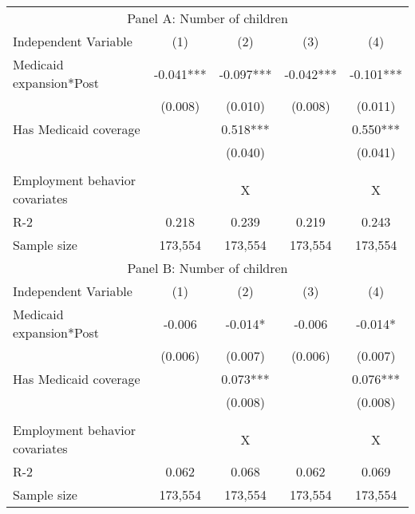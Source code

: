 \begin{tabular}{lcccc}
\toprule
\toprule
 \multicolumn{5}{c}{Panel A: Number of children } \\
 Independent Variable & (1) & (2) & (3) &  (4) \\
\midrule 
 Medicaid expansion*Post   & -0.041***   & -0.097***   & -0.042***   & -0.101***  \\
 & (0.008)   & (0.010)   & (0.008)   & (0.011)  \\
 Has Medicaid coverage   &   & 0.518***   &   & 0.550***  \\
 &    & (0.040)   &    & (0.041)  \\
\\
Employment behavior covariates  &  & X &  & X \\
R-2 & 0.218 & 0.239 & 0.219 & 0.243 \\
Sample size & 173,554 & 173,554 & 173,554 & 173,554 \\
\midrule
\midrule
 \multicolumn{5}{c}{Panel B: Number of children } \\
 Independent Variable & (1) & (2) & (3) &  (4) \\
\midrule 
 Medicaid expansion*Post   & -0.006   & -0.014*   & -0.006   & -0.014*  \\
 & (0.006)   & (0.007)   & (0.006)   & (0.007)  \\
 Has Medicaid coverage   &   & 0.073***   &   & 0.076***  \\
 &    & (0.008)   &    & (0.008)  \\
\\
Employment behavior covariates  &  & X &  & X \\
R-2 & 0.062 & 0.068 & 0.062 & 0.069 \\
Sample size & 173,554 & 173,554 & 173,554 & 173,554 \\
\midrule
\midrule
\bottomrule
\end{tabular}